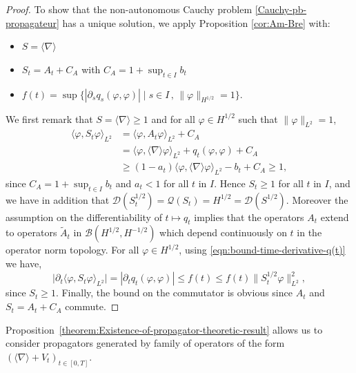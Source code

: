 \documentclass[12pt]{article}
\newcommand{\jnabla}{{\langle\nabla\rangle}}
\theoremstyle{plain}
\begin{document}
\begin{proof}
    To show that the non-autonomous Cauchy problem \eqref{Cauchy-pb-propagateur} has a unique solution, we apply Proposition \ref{cor:Am-Bre} with:
   \begin{itemize}
       \item $S=\jnabla$
       \item $S_t=A_t+C_A$ with $C_A = 1 + \sup_{t\in I} b_t$
       \item $f(t)=\sup\{|\partial_s q_s(\varphi,\varphi)|\mid s\in I\,,\, \|\varphi\|_{H^{1/2}}=1\}$.
   \end{itemize}  
   We first remark that $S=\jnabla\geq 1$ and for all $\varphi\in H^{1/2}$ such that $\|\varphi\|_{L^2}=1$,
   \begin{align*}
       \langle \varphi, S_t\varphi\rangle_{L^2}&=\langle\varphi,A_t\varphi\rangle_{L^2}+C_A\\
       &=\langle\varphi,\jnabla\varphi\rangle_{L^2}+q_t(\varphi,\varphi)+C_A\\
       &\ge(1-a_t)\langle\varphi,\jnabla\varphi\rangle_{L^2}-b_t+C_A\ge1,
   \end{align*}
   since $C_A = 1 + \sup_{t\in I} b_t$ and $a_t<1$ for all $t$ in $I$. Hence $S_t\geq 1$ for all $t$ in $I$, and we have in addition that  $\mathcal{D}(S_t^{1/2})=\mathcal{Q}(S_t)=H^{1/2}=\mathcal{D}(S^{1/2})$. Moreover the assumption on the differentiability of $t\mapsto q_t$ implies that the operators $A_t$ extend to operators $\tilde{A}_t$ in $\mathcal{B}(H^{1/2},H^{-1/2})$ which depend continuously on $t$ in the operator norm topology.
   For all $\varphi\in H^{1/2}$, using  \eqref{eqn:bound-time-derivative-q(t)} we have,
   \begin{equation*}
        \big|\partial_t \langle \varphi,S_t\varphi \rangle_{L^2}\big|=|\partial_tq_t(\varphi,\varphi)| \leq f(t) \leq f(t) \|S_t^{1/2}\varphi\|_{L^2}^2   , 
   \end{equation*}
   since $S_t\ge1$.
Finally, the bound on the commutator is obvious since $A_t$ and $S_t=A_t+C_A$ commute.
\end{proof}


Proposition~\ref{theorem:Existence-of-propagator-theoretic-result} allows us to consider propagators generated by family of operators of the form $(\jnabla + V_t)_{t\in [0,T]}$. 
\end{document}
